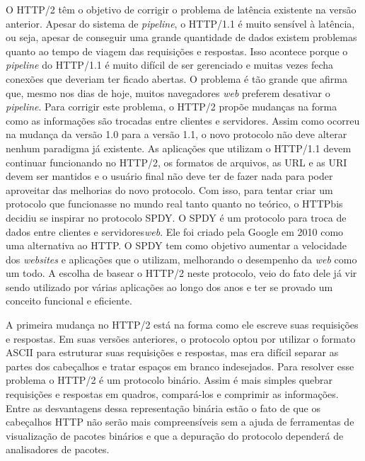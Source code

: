 O HTTP/2 têm o objetivo de corrigir o problema de latência existente na versão anterior. Apesar do sistema de \textit{pipeline}, o HTTP/1.1 é muito sensível à latência, ou seja, apesar de conseguir uma grande quantidade de dados existem problemas quanto ao tempo de viagem das requisições e respostas. Isso acontece porque o \textit{pipeline} do HTTP/1.1 é muito difícil de ser gerenciado e muitas vezes fecha conexões que deveriam ter ficado abertas. O problema é tão grande que  afirma que, mesmo nos dias de hoje, muitos navegadores \textit{web} preferem desativar o \textit{pipeline}. Para corrigir este problema, o HTTP/2 propõe mudanças na forma como as informações são trocadas entre clientes e servidores. Assim como ocorreu na mudança da versão 1.0 para a versão 1.1, o novo protocolo não deve alterar nenhum paradigma já existente. As aplicações que utilizam o HTTP/1.1 devem continuar funcionando no HTTP/2, os formatos de arquivos, as URL e as URI devem ser mantidos e o usuário final não deve ter de fazer nada para poder aproveitar das melhorias do novo protocolo. Com isso, para tentar criar um protocolo que funcionasse no mundo real tanto quanto no teórico, o HTTPbis decidiu se inspirar no protocolo SPDY. O SPDY \cite{SPDY} é um protocolo para troca de dados entre clientes e servidores\textit{web}. Ele foi criado pela Google em 2010 como uma alternativa ao HTTP. O SPDY tem como objetivo aumentar a velocidade dos \textit{websites} e aplicações que o utilizam, melhorando o desempenho da \textit{web} como um todo. A escolha de basear o HTTP/2 neste protocolo, veio do fato dele já vir sendo utilizado por várias aplicações ao longo dos anos e ter se provado um conceito funcional e eficiente.

A primeira mudança no HTTP/2 está na forma como ele escreve suas requisições e respostas. Em suas versões anteriores, o protocolo optou por utilizar o formato ASCII para estruturar suas requisições e respostas, mas era difícil separar as partes dos cabeçalhos e tratar espaços em branco indesejados. Para resolver esse problema o HTTP/2 é um protocolo binário. Assim é mais simples quebrar requisições e respostas em quadros, compará-los e comprimir as informações. Entre as desvantagens dessa representação binária estão o fato de que os cabeçalhos HTTP não serão mais compreensíveis sem a ajuda de ferramentas de visualização de pacotes binários e que a depuração do protocolo dependerá de analisadores de pacotes.

